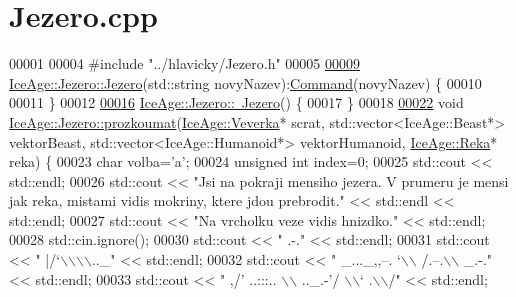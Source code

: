 \hypertarget{Jezero_8cpp_source}{}\section{Jezero.\+cpp}
\label{Jezero_8cpp_source}

\begin{DoxyCode}
00001 
00004 \textcolor{preprocessor}{#include "../hlavicky/Jezero.h"}
00005 
\hypertarget{Jezero_8cpp_source.tex_l00009}{}\hyperlink{classIceAge_1_1Jezero_aef3e83dcf70348c374349b8c515471d9}{00009} \hyperlink{classIceAge_1_1Jezero_aef3e83dcf70348c374349b8c515471d9}{IceAge::Jezero::Jezero}(std::string novyNazev):\hyperlink{classIceAge_1_1Command}{Command}(novyNazev) \{
00010 
00011 \}
00012 
\hypertarget{Jezero_8cpp_source.tex_l00016}{}\hyperlink{classIceAge_1_1Jezero_ac0a6358ddc8d39f5d5c3220cf80658ae}{00016} \hyperlink{classIceAge_1_1Jezero_ac0a6358ddc8d39f5d5c3220cf80658ae}{IceAge::Jezero::~Jezero}() \{
00017 \}
00018 
\hypertarget{Jezero_8cpp_source.tex_l00022}{}\hyperlink{classIceAge_1_1Jezero_ae105afa2b2e2c50e5b899181e6170949}{00022} \textcolor{keywordtype}{void} \hyperlink{classIceAge_1_1Jezero_ae105afa2b2e2c50e5b899181e6170949}{IceAge::Jezero::prozkoumat}(\hyperlink{classIceAge_1_1Veverka}{IceAge::Veverka}* scrat, 
      std::vector<IceAge::Beast*> vektorBeast, std::vector<IceAge::Humanoid*> vektorHumanoid, 
      \hyperlink{classIceAge_1_1Reka}{IceAge::Reka}* reka) \{
00023     \textcolor{keywordtype}{char} volba=\textcolor{charliteral}{'a'};
00024     \textcolor{keywordtype}{unsigned} \textcolor{keywordtype}{int} index=0;
00025     std::cout << std::endl;
00026     std::cout << \textcolor{stringliteral}{"Jsi na pokraji mensiho jezera. V prumeru je mensi jak reka, mistami vidis mokriny, ktere
       jdou prebrodit."} << std::endl << std::endl;
00027     std::cout << \textcolor{stringliteral}{"Na vrcholku veze vidis hnizdko."} << std::endl;
00028     std::cin.ignore();
00030 std::cout << \textcolor{stringliteral}{"                         .-."}                     << std::endl;
00031 std::cout << \textcolor{stringliteral}{"                        |/`\(\backslash\)\(\backslash\)\(\backslash\)\(\backslash\)..\_"}               << std::endl;
00032 std::cout << \textcolor{stringliteral}{"     \_...\_,,--.         `\(\backslash\)\(\backslash\) /.--.\(\backslash\)\(\backslash\) \_.-."}         << std::endl;
00033 std::cout << \textcolor{stringliteral}{"  ,/'  ..:::.. \(\backslash\)\(\backslash\)     ..\_.-'/    \(\backslash\)\(\backslash\)` .\(\backslash\)\(\backslash\)/"}        << std::endl;

\end{DoxyCode}
